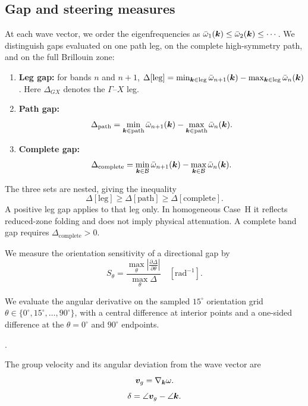 \subsection{Gap and steering measures}
At each wave vector, we order the eigenfrequencies as $\bar{\omega}_1(\bm{k})\le\bar{\omega}_2(\bm{k})\le\cdots$. We distinguish gaps evaluated on one path leg, on the complete high-symmetry path, and on the full Brillouin zone:
\begin{enumerate}[label=(\alph*)]
  \item \textbf{Leg gap:} for bands $n$ and $n+1$, $\Delta[\mathrm{leg}]=\min_{\bm{k}\in\mathrm{leg}}\bar{\omega}_{n+1}(\bm{k})-\max_{\bm{k}\in\mathrm{leg}}\bar{\omega}_n(\bm{k})$. Here $\Delta_{GX}$ denotes the $\Gamma$--$X$ leg.
  \item \textbf{Path gap:}
  \begin{equation}
  \Delta_{\mathrm{path}}=\min_{\bm{k}\in\mathrm{path}}\bar{\omega}_{n+1}(\bm{k})-\max_{\bm{k}\in\mathrm{path}}\bar{\omega}_n(\bm{k}).
  \label{eq:delta_path}
  \end{equation}
  \item \textbf{Complete gap:}
  \begin{equation}
  \Delta_{\mathrm{complete}}=\min_{\bm{k}\in\mathcal{B}}\bar{\omega}_{n+1}(\bm{k})-\max_{\bm{k}\in\mathcal{B}}\bar{\omega}_n(\bm{k}).
  \label{eq:delta_complete}
  \end{equation}
\end{enumerate}
The three sets are nested, giving the inequality
\begin{equation}
\Delta[\mathrm{leg}]\ge\Delta[\mathrm{path}]\ge\Delta[\mathrm{complete}].
\label{eq:gap_hierarchy}
\end{equation}
A positive leg gap applies to that leg only. In homogeneous Case~H it reflects reduced-zone folding and does not imply physical attenuation. A complete band gap requires $\Delta_{\mathrm{complete}}>0$.

We measure the orientation sensitivity of a directional gap by
\begin{equation}
S_\theta=\frac{\max_\theta\left|\frac{\partial\Delta}{\partial\theta}\right|}{\max_\theta\Delta}\quad[\mathrm{rad}^{-1}].
\label{eq:S_theta_def}
\end{equation}
{\sloppy  We evaluate the angular derivative on the sampled $15^\circ$ orientation grid $\theta\in\{0^\circ,15^\circ,\ldots,90^\circ\}$, with a central difference at interior points and a one-sided difference at the $\theta=0^\circ$ and $90^\circ$ endpoints.\par}.

The group velocity and its angular deviation from the wave vector are
\begin{equation}
\bm{v}_g=\nabla_{\bm{k}}\omega.
\label{eq:group_velocity}
\end{equation}
\begin{equation}
\delta=\angle\bm{v}_g-\angle\bm{k}.
\label{eq:steering_angle}
\end{equation}

